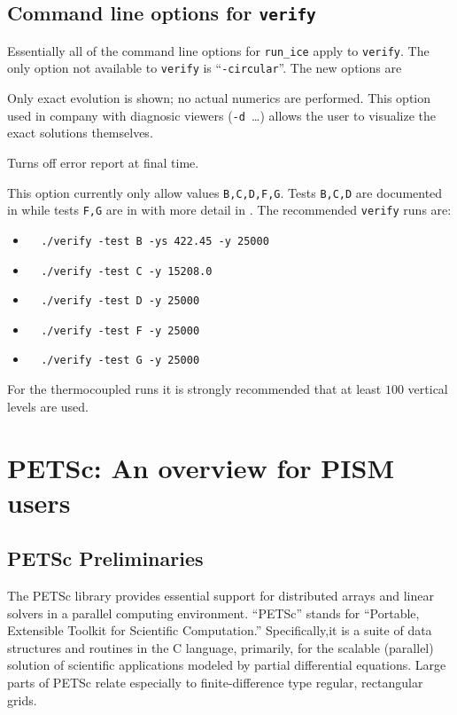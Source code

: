 \documentclass[11pt,final]{amsart}
\renewcommand{\t}[1]{\texttt{#1}}
\begin{document}
\subsection{Command line options for \t{verify}}  Essentially all of the command line options for \verb|run_ice| apply to \t{verify}.  The only option not available to \t{verify} is ``\t{-circular}''.  The new options are

  Only exact evolution is shown; no actual numerics are performed.  This option used in company with diagnosic viewers (\verb|-d |\dots) allows the user to visualize the exact solutions themselves.

  Turns off error report at final time.

  This option currently only allow values \t{B,C,D,F,G}.  Tests \t{B,C,D} are documented in \cite{BLKCB} while tests \t{F,G} are in \cite{BKL} with more detail in \cite{BK}.  The recommended \t{verify} runs are:\begin{itemize}
\item \verb|  ./verify -test B -ys 422.45 -y 25000|
\item \verb|  ./verify -test C -y 15208.0|
\item \verb|  ./verify -test D -y 25000|
\item \verb|  ./verify -test F -y 25000|
\item \verb|  ./verify -test G -y 25000|
\end{itemize}
For the thermocoupled runs it is strongly recommended that at least $100$ vertical levels are used.



\section{PETSc: An overview for PISM users}

\subsection{PETSc Preliminaries}
The PETSc library \cite{petsc-web-page,petsc-user-ref,petsc-efficient} provides essential support for distributed arrays and linear solvers in a parallel computing environment.  ``PETSc'' stands for ``Portable, Extensible Toolkit for Scientific Computation.''  Specifically,it is a suite of data structures and routines in the C language, primarily, for the scalable (parallel) solution of scientific applications modeled by partial differential equations.  Large parts of PETSc relate especially to finite-difference type regular, rectangular grids.
\end{document}
